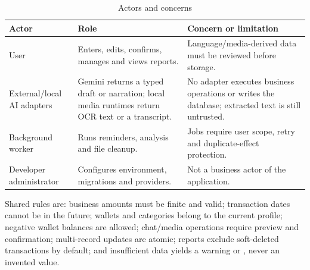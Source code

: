 \begin{table}[H]
  \centering
  \caption{Actors and concerns}
  \label{tab:actors}
  \begin{tabularx}{\textwidth}{@{}L{3.2cm}Y Y@{}}
    \toprule
    \textbf{Actor} & \textbf{Role} & \textbf{Concern or limitation} \\
    \midrule
    User & Enters, edits, confirms, manages and views reports. & Language/media-derived data must be reviewed before storage. \\
    External/local AI adapters & Gemini returns a typed draft or narration; local media runtimes return OCR text or a transcript. & No adapter executes business operations or writes the database; extracted text is still untrusted. \\
    Background worker & Runs reminders, analysis and file cleanup. & Jobs require user scope, retry and duplicate-effect protection. \\
    Developer administrator & Configures environment, migrations and providers. & Not a business actor of the application. \\
    \bottomrule
  \end{tabularx}
\end{table}

Shared rules are: business amounts must be finite and valid; transaction dates cannot be in the future; wallets and categories belong to the current profile; negative wallet balances are allowed; chat/media operations require preview and confirmation; multi-record updates are atomic; reports exclude soft-deleted transactions by default; and insufficient data yields a warning or , never an invented value.


